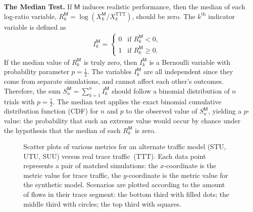 \documentclass[conference]{IEEEtran}
\newcommand{\caps}[1]{{\small{#1}}}
\newcommand{\M}{\mathsf{M}}
\newcommand{\TTT}{\text{TTT}}
\begin{document}
\textbf{The Median Test.} If $\M$ induces realistic performance, then the median of each log-ratio variable, $R_k^\M=\log(X_k^\M/X_k^\TTT)$, should be zero. The $k^\text{th}$ indicator variable is defined as
\begin{align}
	I_k^\M = \begin{cases}
		0 & \text{if $R_k^\M < 0$,} \\
		1 & \text{if $R_k^\M \ge 0$.}
	\end{cases}
\end{align}
If the median value of $R_k^\M$ is truly zero, then $I_k^\M$ is a Bernoulli variable with probability parameter $p=\frac{1}{2}$. The variables $I_k^\M$ are all independent since they come from separate simulations, and cannot affect each other's outcomes. Therefore, the sum $S_n^\M = \sum_{k=1}^n {I_k^\M}$ should follow a binomial distribution of $n$ trials with $p=\frac{1}{2}$. The median test applies the exact binomial cumulative distribution function (\caps{CDF}) %
 for $n$ and $p$ to the observed value of $S_n^\M$, yielding a $p$-value: the probability that such an extreme value would occur by chance under the hypothesis that the median of each $R_k^\M$ is zero. %

\begin{figure}
\begin{centering}
\caption{Scatter plots of various metrics for an alternate traffic model ({\footnotesize{STU}}, {\footnotesize{UTU}}, {\footnotesize{SUU}}) versus real trace traffic~({\footnotesize{TTT}}). Each data point represents a pair of matched simulations: the $x$-coordinate is the metric value for trace traffic, the $y$-coordinate is the metric value for the synthetic model. Scenarios are plotted according to the amount of flows in their trace segment: the bottom third with filled dots; the middle third with circles; the top third with squares.}
\label{fig:scatterplots}
\end{centering}
\vspace{-1em}
\end{figure}
\end{document}
